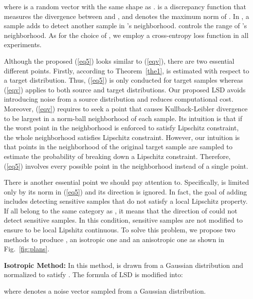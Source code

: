 \documentclass[journal,twocolumn]{IEEEtran}
\theoremstyle{definition}
\begin{document}
where  is a random vector with the same shape as .  is a discrepancy function that measures the divergence between  and , and  denotes the maximum norm of . In , a sample  adds  to detect another sample in 's neighborhood.  controls the range of 's neighborhood. As for the choice of , we employ a cross-entropy loss function in all experiments.

Although the proposed (\ref{eq5}) looks similar to (\ref{eqv}), there are two essential different points. Firstly, according to Theorem~\ref{the1},  is estimated with respect to a target distribution. Thus, (\ref{eq5}) is only conducted for target samples whereas (\ref{eqv}) applies to both source and target distributions. Our proposed LSD avoids introducing noise from a source distribution and reduces computational cost. Moreover, (\ref{eqv}) requires to seek a point that causes Kullback-Leibler divergence to be largest in a norm-ball neighborhood of each sample. Its intuition is that if the worst point in the neighborhood is enforced to satisfy Lipschitz constraint, the whole neighborhood satisfies Lipschitz constraint. However, our intuition is that points in the neighborhood of the original target sample are sampled to estimate the probability of  breaking down a Lipschitz constraint. Therefore, (\ref{eq5}) involves every possible point in the neighborhood instead of a single point.

There is another essential point we should pay attention to. Specifically,  is limited only by its norm in (\ref{eq5}) and its direction is ignored. In fact, the goal of adding  includes detecting sensitive samples that do not satisfy a local Lipschitz property. If all  belong to the same category as , it means that the direction of  could not detect sensitive samples. In this condition, sensitive samples are not modified to ensure  to be local Lipshitz continuous. To solve this problem, we propose two methods to produce , an isotropic one and an anisotropic one as shown in Fig.~\ref{fig:plans}.

{\bf Isotropic Method:} In this method,  is drawn from a Gaussian distribution and normalized to satisfy . The formula of LSD is modified into:

where  denotes a noise vector sampled from a Gaussian distribution.
\end{document}
